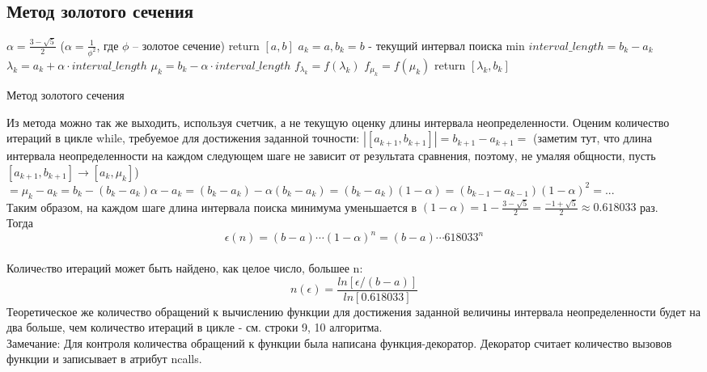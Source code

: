 \documentclass[main.tex]{subfiles}
\begin{document}
	\subsection{Метод золотого сечения}
	\begin{algorithm}[H]\label{golden_ratio}
		
		
		$\alpha = \frac{3-\sqrt{5}}{2}$ ($\alpha = \frac{1}{\phi^2}$, где $\phi$ -- золотое сечение)\;
		 {return $[a, b]$}
		$a_k = a, b_k = b$ - текущий интервал поиска min\;
		$interval\_length = b_k - a_k$\;
		$\lambda_k = a_k + \alpha\cdot interval\_length$\;
		$\mu_k = b_k - \alpha\cdot interval\_length$\;
		$f_{\lambda_k} = f(\lambda_k)$\;
		$f_{\mu_k} = f(\mu_k)$\;
		return $[\lambda_k, b_k]$\;		
		\caption{Метод золотого сечения}
	\end{algorithm}\newpage
	Из метода можно так же выходить, используя счетчик, а не текущую оценку длины интервала неопределенности. Оценим количество итераций в цикле while, требуемое для достижения заданной точности: $|[a_{k+1}, b_{k+1}]| = b_{k+1} - a_{k+1} = $ (заметим тут, что длина интервала неопределенности на каждом следующем шаге не зависит от результата сравнения, поэтому, не умаляя общности, пусть $[a_{k+1}, b_{k+1}] \rightarrow [a_k, \mu_k]$) $ = \mu_k - a_k = b_k - (b_k - a_k)\alpha - a_k = (b_k - a_k) - \alpha(b_k - a_k) = (b_k - a_k)(1 - \alpha) = (b_{k-1} - a_{k-1})(1 - \alpha)^2 = ...$\\
	Таким образом, на каждом шаге длина интервала поиска минимума уменьшается в \newline $(1 - \alpha) = 1 -  \frac{3-\sqrt{5}}{2} = \frac{-1 +\sqrt{5}}{2} \approx 0.618033$ раз.\\
	Тогда $$\epsilon(n) = (b - a)\cdots(1 - \alpha)^n = (b - a)\cdots 618033^n$$\\
	Количеcтво итераций может быть найдено, как целое  число, большее n:$$n(\epsilon) = \frac{ln[\epsilon/(b-a)]}{ln[0.618033]}$$
	Теоретическое же количество обращений к вычислению функции для достижения заданной величины интервала неопределенности будет на два больше, чем количество итераций в цикле - см. строки 9, 10 алгоритма.\\
	Замечание: Для контроля количества обращений к функции была написана функция-декоратор. Декоратор считает количество вызовов функции и записывает в атрибут ncalls.
	 
\end{document}
